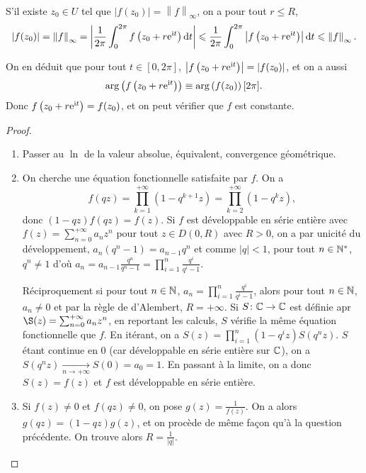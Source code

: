 \documentclass[12pt]{article}
\begin{document}
\begin{remark}
    S'il existe $z_{0}\in U$ tel que $\left\lvert f(z_{0})\right\rvert=\left\lVert f\right\rVert_{\infty}$, on a pour tout $r\leqslant R$,
    \begin{equation}
        \left\lvert f(z_{0})\right\rvert=\left\lVert f\right\rVert_{\infty}=\left\lvert \frac{1}{2\pi}\int_{0}^{2\pi}f\left(z_{0}+r\mathrm{e}^{\mathrm{i} t}\right)\mathrm{d} t\right\rvert\leqslant\frac{1}{2\pi}\int_{0}^{2\pi}\left\lvert f\left(z_{0}+r\mathrm{e}^{\mathrm{i} t}\right)\right\rvert\mathrm{d} t\leqslant\left\lVert f\right\rVert_{\infty}.
    \end{equation}

    On en déduit que pour tout $t\in[0,2\pi]$, $\left\lvert f\left(z_0+r\mathrm{e}^{\mathrm{i} t}\right)\right\rvert=\left\lvert f(z_{0})\right\rvert$, et on a aussi 
    \begin{equation*}
        \arg\left(f\left(z_{0}+r\mathrm{e}^{\mathrm{i} t}\right)\right)\equiv\arg\left(f(z_0)\right)[2\pi].    
    \end{equation*}
    Donc $f\left(z_{0}+r\mathrm{e}^{\mathrm{i} t}\right)=f(z_{0})$, et on peut vérifier que $f$ est constante.
\end{remark}

\begin{proof}
    \phantom{}
    \begin{enumerate}
        \item Passer au $\ln$ de la valeur absolue, équivalent, convergence géométrique.
        \item On cherche une équation fonctionnelle satisfaite par $f$.
        On a 
        \begin{equation*}
            f(qz)=\prod_{k=1}^{+\infty}\left(1-q^{k+1}z\right)=\prod_{k=2}^{+\infty}\left(1-q^{k}z\right),
        \end{equation*}donc $(1-qz)f(qz)=f(z)$.
        Si $f$ est développable en série entière avec $f(z)=\sum_{n=0}^{+\infty}a_nz^{n}$ pour tout $z\in D(0,R)$ avec $R>0$, on a par unicité du développement, $a_n(q^{n}-1)=a_{n-1}q^{n}$ et comme $\left\lvert q\right\rvert<1$, pour tout $n\in\mathbb{N}^{*}$, $q^{n}\neq1$ d'où $a_{n}=a_{n-1}\frac{q^{n}}{q^{n}-1}=\prod_{i=1}^{n}\frac{q^{i}}{q^{i}-1}$.

        Réciproquement si pour tout $n\in\mathbb{N}$, $a_n=\prod_{i=1}^{n}\frac{q^{i}}{q^{i}-1}$, alors pour tout $n\in\mathbb{N}$, $a_n\neq0$ et par la règle de d'Alembert, $R=+\infty$. Si $S\colon\mathbb{C}\to\mathbb{C}$ est définie apr $\S(z)=\sum_{n=0}^{+\infty}a_n z^{n}$, en reportant les calculs, $S$ vérifie la même équation fonctionnelle que $f$. En itérant, on a $S(z)=\prod_{i=1}^{n}(1-q^{i}z)S(q^{n}z)$. $S$ étant continue en 0 (car développable en série entière sur $\mathbb{C}$), on a $S(q^{n}z)\xrightarrow[n\to+\infty]{}S(0)=a_0=1$. En passant à la limite, on a donc $S(z)=f(z)$ et $f$ est développable en série entière.

        \item Si $f(z)\neq0$ et $f(qz)\neq0$, on pose $g(z)=\frac{1}{f(z)}$. On a alors $g(qz)=(1-qz)g(z)$, et on procède de même façon qu'à la question précédente. On trouve alors $R=\frac{1}{\left\lvert q\right\rvert}$.
    \end{enumerate}
\end{proof}
\end{document}
